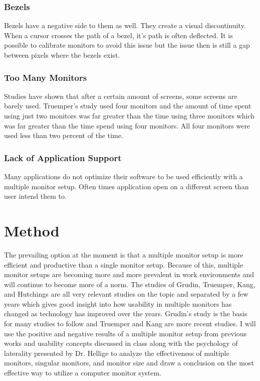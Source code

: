 \documentclass[a4paper]{article}
\begin{document}
\subsubsection{Bezels}
Bezels have a negative side to them as well. They create a visual discontinuity.  When a cursor crosses the path of a bezel, it's path is often deflected. It is possible to calibrate monitors to avoid this issue but the issue then is still a gap between pixels where the bezels exist.\cite{Truemper} 

\subsubsection{Too Many Monitors}
Studies have shown that after a certain amount of screens, some screens are barely used. Truemper's study used four monitors and the amount of time spent using just two monitors was far greater than the time using three monitors which was far greater than the time spend using four monitors. All four monitors were used less than two percent of the time.\cite{Truemper}

\subsubsection{Lack of Application Support}
Many applications do not optimize their software to be used efficiently with a multiple monitor setup.\cite{Grudin} Often times application open on a different screen than user intend them to.\cite{Grudin}


\section{Method}
The prevailing option at the moment is that a multiple monitor setup is more efficient and productive than a single monitor setup. Because of this, multiple monitor setups are becoming more and more prevalent in work environments and will continue to become more of a norm. The studies of Grudin, Truemper, Kang, and Hutchings are all very relevant studies on the topic and separated by a few years which gives good insight into how usability in multiple monitors has changed as technology has improved over the years. Grudin's study is the basis for many studies to follow and Truemper and Kang are more recent studies. I will use the positive and negative results of a multiple monitor setup from previous works and usability concepts discussed in class along with the psychology of laterality presented by Dr. Hellige to analyze the effectiveness of multiple monitors, singular monitors, and monitor size and draw a conclusion on the most effective way to utilize a computer monitor system.
\end{document}
